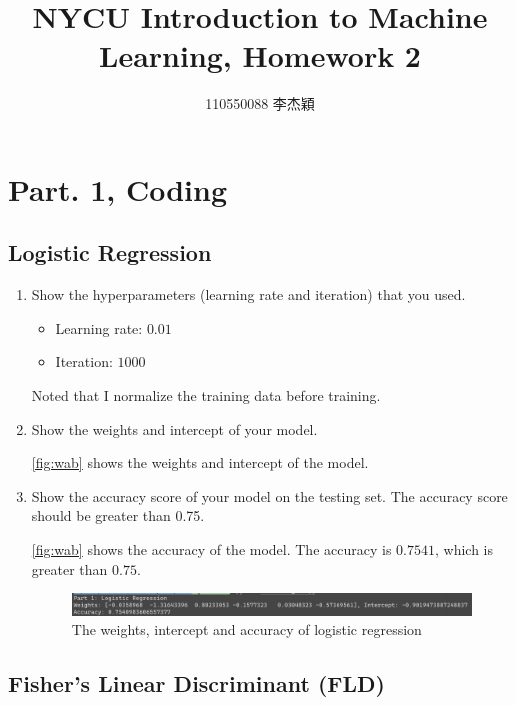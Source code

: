 \documentclass[twocolumn]{extarticle}
\title{NYCU Introduction to Machine Learning, Homework 2}
\author{110550088 李杰穎}
\date{}
\begin{document}
\maketitle

\section{Part. 1, Coding}
\subsection{Logistic Regression}
\begin{enumerate}
\item Show the hyperparameters (learning rate and iteration) that you used.

\begin{itemize}
	\item Learning rate: $0.01$
	\item Iteration: $1000$
\end{itemize}

Noted that I normalize the training data before training.

\item Show the weights and intercept of your model.

\autoref{fig:wab} shows the weights and intercept of the model.

\item Show the accuracy score of your model on the testing set. The accuracy score should be greater than 0.75.

\autoref{fig:wab} shows the accuracy of the model. The accuracy is $0.7541$, which is greater than $0.75$.

\begin{figure}[H]
\centering
\includegraphics[width=0.95\linewidth]{wab}
\caption{The weights, intercept and accuracy of logistic regression}
\label{fig:wab}
\end{figure}

\end{enumerate}

\subsection{Fisher's Linear Discriminant (FLD)}
\end{document}
